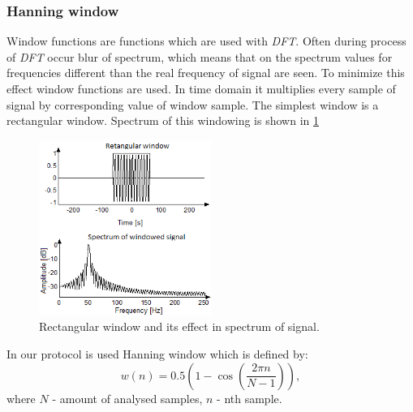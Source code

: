 \documentclass[11pt,titlepage]{article}
\theoremstyle{plain}
\begin{document}
\subsubsection{Hanning window}
Window functions are functions which are used with \textit{DFT}. Often during process of \textit{DFT} occur blur of spectrum, which means that on the spectrum values for frequencies different than the real frequency of signal are seen. To minimize this effect window functions are used. In time domain it multiplies every sample of signal by corresponding value of window sample. The simplest window is a rectangular window. Spectrum of this windowing is shown in \ref{fig:F9}
\begin{figure}[H]
	\centering
	\includegraphics[width=0.5\textwidth]{img/rectangular_window}
	\caption{Rectangular window and its effect in spectrum of signal.}
	\label{fig:F9}
\end{figure}

\vspace{5mm}

In our protocol is used Hanning window which is defined by:
\begin{equation}
	 w(n) = 0.5 (1 - \cos\left(\frac{2 \pi n}{N - 1}\right)),
\end{equation}
\newline where $N$ - amount of analysed samples, $n$ - nth sample. 

\vspace{5mm}
\end{document}
